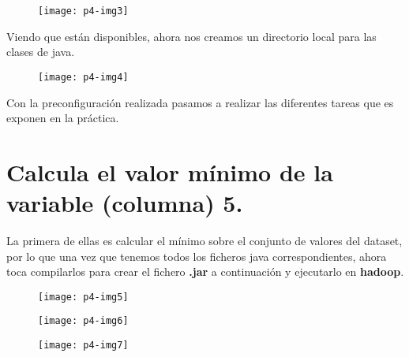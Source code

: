 \documentclass[10pt]{article}
\begin{document}
 \begin{figure}[H]
	\begin{center}
 		\texttt{[image: p4-img3]}
	\end{center} 
\end{figure}

Viendo que están disponibles, ahora nos creamos un directorio local para las clases de java. \\

 \begin{figure}[H]
	\begin{center}
 		\texttt{[image: p4-img4]}
	\end{center} 
\end{figure}

Con la preconfiguración realizada pasamos a realizar las diferentes tareas que es exponen en la práctica. \\


\section{Calcula el valor mínimo de la variable (columna) 5.} 
La primera de ellas es calcular el mínimo sobre el conjunto de valores del dataset, por lo que una vez que tenemos todos los ficheros java correspondientes, ahora toca compilarlos para crear el fichero \textbf{.jar} a continuación y ejecutarlo en \textbf{hadoop}.\\

\begin{figure}[H]
	\begin{center}
 		\texttt{[image: p4-img5]}
	\end{center} 
\end{figure}

\begin{figure}[H]
	\begin{center}
 		\texttt{[image: p4-img6]}
	\end{center} 
\end{figure}

\begin{figure}[H]
	\begin{center}
 		\texttt{[image: p4-img7]}
	\end{center} 
\end{figure}
\end{document}
